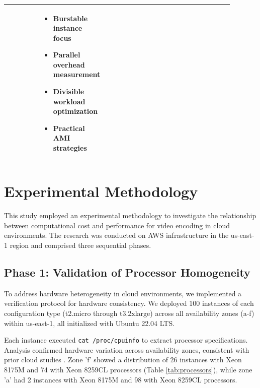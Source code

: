 \documentclass[conference]{IEEEtran}
\begin{document}
\begin{table}[!htbp]
\begin{tabular}{|p{0.15\linewidth}|p{0.18\linewidth}|p{0.28\linewidth}|p{0.28\linewidth}|}
\begin{itemize}
				\vspace{-0.2cm}
			\end{itemize}
			& 
			\scriptsize
			\begin{itemize}
				\vspace{-0.2cm}
				\item Burstable instance focus
				\item Parallel overhead measurement
				\item Divisible workload optimization
				\item Practical AMI strategies
				\vspace{-0.2cm}
			\end{itemize}
			\\
			\hline
		\end{tabular}
	\end{table}
	
	\section{Experimental Methodology}
	\label{met}
	
	This study employed an experimental methodology to investigate the relationship between computational cost and performance for video encoding in cloud environments. The research was conducted on AWS infrastructure in the us-east-1 region and comprised three sequential phases.
	
	\subsection{Phase 1: Validation of Processor Homogeneity}
	\label{met:validation-processor-homogeneity}
	
	To address hardware heterogeneity in cloud environments, we implemented a verification protocol for hardware consistency. We deployed 100 instances of each configuration type (t2.micro through t3.2xlarge) across all availability zones (a-f) within us-east-1, all initialized with Ubuntu 22.04 LTS.
	
	Each instance executed \texttt{cat /proc/cpuinfo} to extract processor specifications. Analysis confirmed hardware variation across availability zones, consistent with prior cloud studies \cite{b2, b5, b6, b7}. Zone 'f' showed a distribution of 26 instances with Xeon 8175M and 74 with Xeon 8259CL processors (Table \ref{tab:processors}), while zone 'a' had 2 instances with Xeon 8175M and 98 with Xeon 8259CL processors.
	
\end{document}
